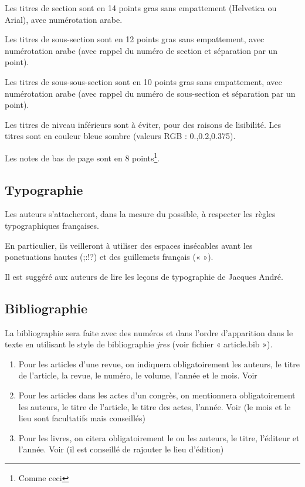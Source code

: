 \documentclass[city=Montpellier,year=2015]{jres}
\begin{document}
Les titres de section sont en 14 points gras sans empattement
(Helvetica ou Arial), avec numérotation arabe.

Les titres de sous-section sont en 12 points gras sans empattement,
avec numérotation arabe (avec rappel du numéro de section et
séparation par un point).

Les titres de sous-sous-section sont en 10 points gras sans empattement,
avec numérotation arabe (avec rappel du numéro de sous-section et
séparation par un point).

Les titres de niveau inférieurs sont à éviter, pour des raisons de
lisibilité.
Les titres sont en couleur bleue sombre (valeurs RGB : 0.,0.2,0.375).  

Les notes de bas de page sont en 8 points\footnote{Comme ceci}.

\subsection{Typographie}

Les auteurs s'attacheront, dans la mesure du possible, à respecter les
règles typographiques françaises.

En particulier, ils veilleront à utiliser des espaces insécables avant
les ponctuations hautes (;:!?) et des guillemets français (« »).

Il est suggéré aux auteurs de lire les leçons de
typographie \cite{andre1990} de Jacques André.

\subsection{Bibliographie}

La bibliographie sera faite avec des numéros et dans l'ordre
d'apparition dans le texte en utilisant le style de bibliographie
\emph{jres} (voir fichier « article.bib »).

\begin{enumerate}

    \item Pour les articles d'une revue, on indiquera obligatoirement les
      auteurs, le titre de l'article, la revue, le numéro, le volume,
      l'année et le mois. Voir \cite{exemple1}

    \item Pour les articles dans les actes d'un congrès, on mentionnera
      obligatoirement les auteurs, le titre de l'article, le titre des
      actes, l'année. Voir \cite{exemple2} (le mois et le lieu sont
      facultatifs mais conseillés)

    \item Pour les livres, on citera obligatoirement le ou les auteurs, le
      titre, l'éditeur et l'année. Voir \cite{exemple3} (il est conseillé de
      rajouter le lieu d'édition)

\end{enumerate}
\end{document}
